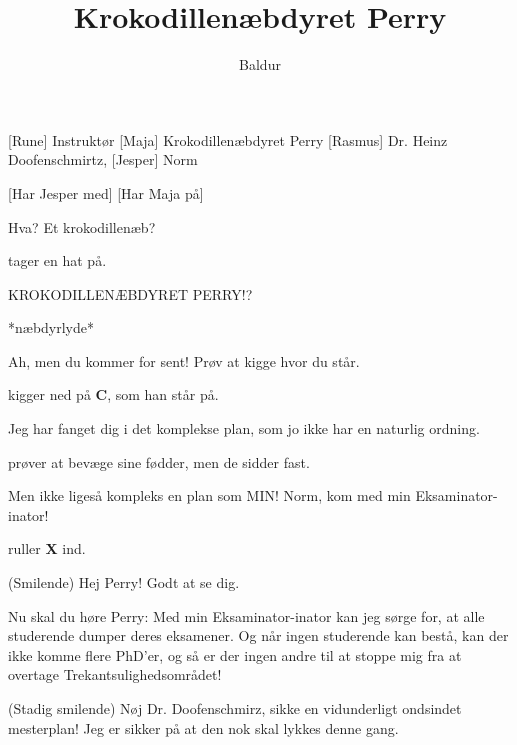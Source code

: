 \documentclass[a4paper,11pt]{article}
\title{Krokodillenæbdyret Perry}
\author{Baldur}
\begin{document}
\maketitle

\begin{roles}
[Rune] Instruktør
[Maja] Krokodillenæbdyret Perry 
[Rasmus] Dr. Heinz Doofenschmirtz, 
[Jesper] Norm 
\end{roles}

\begin{props}
[Har Jesper med]
[Har Maja på]
\end{props}


\begin{sketch}



 Hva? Et krokodillenæb?

 tager en hat på.

 KROKODILLENÆBDYRET PERRY!?

 *næbdyrlyde*

 Ah, men du kommer for sent! Prøv at kigge hvor du står.

 kigger ned på \textbf{C}, som han står på.

 Jeg har fanget dig i det komplekse plan, som jo ikke har en naturlig ordning.

 prøver at bevæge sine fødder, men de sidder fast.

 Men ikke ligeså kompleks en plan som MIN! Norm, kom med min Eksaminator-inator!


 ruller \textbf{X} ind.

 (Smilende) Hej Perry! Godt at se dig.

 Nu skal du høre Perry: Med min Eksaminator-inator kan jeg sørge for, at alle studerende dumper deres eksamener. Og når ingen studerende kan bestå, kan der ikke komme flere PhD’er, og så er der ingen andre til at stoppe mig fra at overtage Trekantsulighedsområdet!

 (Stadig smilende) Nøj Dr. Doofenschmirz, sikke en vidunderligt ondsindet mesterplan! Jeg er sikker på at den nok skal lykkes denne gang.


\end{sketch}
\end{document}
